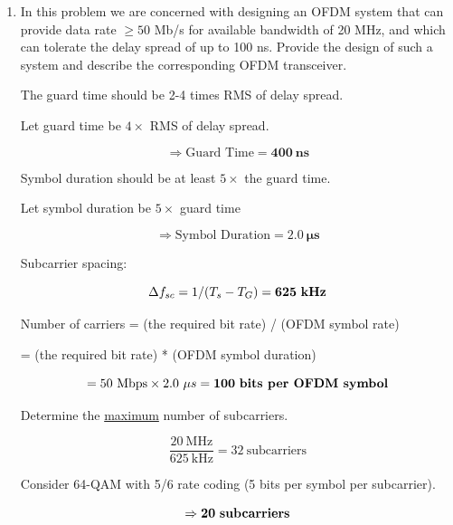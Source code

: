 \documentclass[fleqn]{article}
\begin{document}
\begin{enumerate}
		\item In this problem we are concerned with designing an OFDM system that can provide data rate $\geq 50$ Mb/s for available bandwidth of 20 MHz, and which can tolerate the delay spread of up to 100 ns. Provide the design of such a system and describe the corresponding OFDM transceiver.
		
		The guard time should be 2-4 times RMS of delay spread.
		
		Let guard time be $4\times$ RMS of delay spread.
		
		\begin{equation*}
			\Rightarrow \text{Guard Time} = \mathbf{400\ ns}
		\end{equation*}
		
		Symbol duration should be at least $5\times$ the guard time. 
		
		Let symbol duration be $5\times$ guard time
		
		\begin{equation*}
			\Rightarrow \text{Symbol Duration} = \mathbf{2.0\ \mu{s}}
		\end{equation*}
		
		Subcarrier spacing:
		
		\begin{equation*}
			{\Delta}f_{sc} = 1/(T_s - T_G) = \mathbf{625\ \text{\textbf{kHz}}}
		\end{equation*}
		
		Number of carriers = (the required bit rate) / (OFDM symbol rate)
		
		= (the required bit rate) * (OFDM symbol duration)
		 
		\begin{equation*}
			= 50\ \text{Mbps} \times 2.0\ {\mu}s = \mathbf{100\ \text{\textbf{bits per OFDM symbol}}}
		\end{equation*}
		
		Determine the \underline{maximum} number of subcarriers.
		
		\begin{equation*}
			\frac{20\ \text{MHz}}{625\ \text{kHz}} = 32\ \text{subcarriers}
		\end{equation*}
		
		Consider 64-QAM with 5/6 rate coding (5 bits per symbol per subcarrier).
		
		\begin{equation*}
			\Rightarrow \mathbf{20}\ \text{\textbf{subcarriers}}
		\end{equation*}
		

\end{enumerate}
\end{document}
